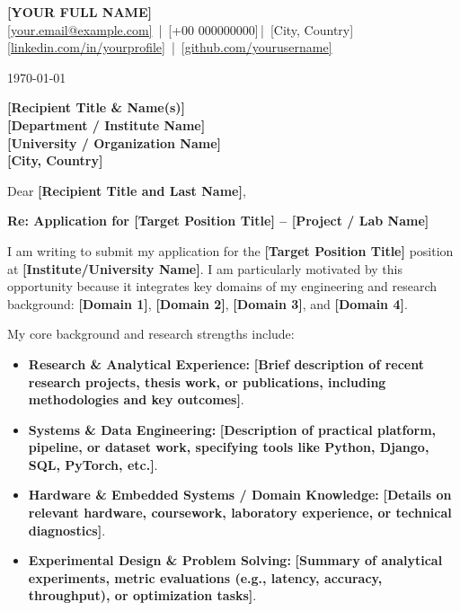 \documentclass[11pt,a4paper]{article}
\makeatletter
\newcommand{\ApplicantName}{[YOUR FULL NAME]}
\newcommand{\ApplicantEmail}{[your.email@example.com]}
\newcommand{\ApplicantPhone}{[+00 000000000]}
\newcommand{\ApplicantLocation}{[City, Country]}
\newcommand{\ApplicantLinkedIn}{[linkedin.com/in/yourprofile]}
\newcommand{\ApplicantGitHub}{[github.com/yourusername]}
\makeatother
\begin{document}
\pagestyle{empty}

{\Large \textbf{\ApplicantName}} \\
\href{mailto:\ApplicantEmail}{\ApplicantEmail} \,|\, \ApplicantPhone \,|\, \ApplicantLocation \\
\href{https://\ApplicantLinkedIn}{\ApplicantLinkedIn} \,|\, \href{https://\ApplicantGitHub}{\ApplicantGitHub}

\vspace{1.5em}

\today

\vspace{1em}

\textbf{[Recipient Title \& Name(s)]} \\
\textbf{[Department / Institute Name]} \\
\textbf{[University / Organization Name]} \\
\textbf{[City, Country]}

\vspace{1.5em}

Dear \textbf{[Recipient Title and Last Name]},

\textbf{Re: Application for \textbf{[Target Position Title]} -- \textbf{[Project / Lab Name]}}

I am writing to submit my application for the \textbf{[Target Position Title]} position at \textbf{[Institute/University Name]}. I am particularly motivated by this opportunity because it integrates key domains of my engineering and research background: \textbf{[Domain 1]}, \textbf{[Domain 2]}, \textbf{[Domain 3]}, and \textbf{[Domain 4]}.

My core background and research strengths include:
\begin{itemize}[leftmargin=1.5em, label=\tiny$\blacksquare$]
    \item \textbf{Research \& Analytical Experience:} \textbf{[Brief description of recent research projects, thesis work, or publications, including methodologies and key outcomes]}.
    \item \textbf{Systems \& Data Engineering:} \textbf{[Description of practical platform, pipeline, or dataset work, specifying tools like Python, Django, SQL, PyTorch, etc.]}.
    \item \textbf{Hardware \& Embedded Systems / Domain Knowledge:} \textbf{[Details on relevant hardware, coursework, laboratory experience, or technical diagnostics]}.
    \item \textbf{Experimental Design \& Problem Solving:} \textbf{[Summary of analytical experiments, metric evaluations (e.g., latency, accuracy, throughput), or optimization tasks]}.
\end{itemize}
\end{document}
